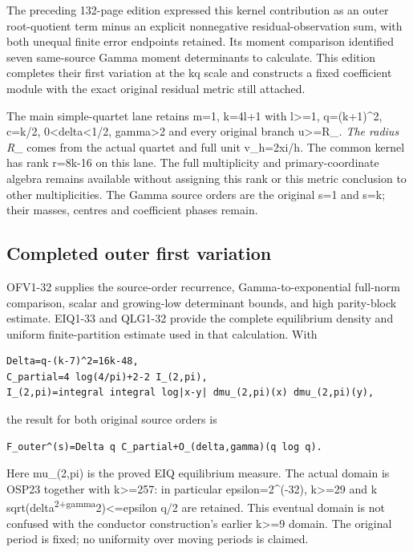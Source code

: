 \documentclass[
]{article}
\begin{document}
The preceding 132-page edition expressed this kernel contribution as an
outer root-quotient term minus an explicit nonnegative
residual-observation sum, with both unequal finite error endpoints
retained. Its moment comparison identified seven same-source Gamma
moment determinants to calculate. This edition completes their first
variation at the kq scale and constructs a fixed coefficient module with
the exact original residual metric still attached.

The main simple-quartet lane retains m=1, k=4l+1 with l\textgreater=1,
q=(k+1)\^{}2, c=k/2, 0\textless delta\textless1/2, gamma\textgreater2
and every original branch \textbar u\textbar\textgreater=R\_\emph{. The
radius R\_} comes from the actual quartet and full unit v\_h=2xi/h. The
common kernel has rank r=8k-16 on this lane. The full multiplicity and
primary-coordinate algebra remains available without assigning this rank
or this metric conclusion to other multiplicities. The Gamma source
orders are the original s=1 and s=k; their masses, centres and
coefficient phases remain.

\subsection{Completed outer first
variation}\label{completed-outer-first-variation}

OFV1-32 supplies the source-order recurrence, Gamma-to-exponential
full-norm comparison, scalar and growing-low determinant bounds, and
high parity-block estimate. EIQ1-33 and QLG1-32 provide the complete
equilibrium density and uniform finite-partition estimate used in that
calculation. With

\begin{verbatim}
Delta=q-(k-7)^2=16k-48,
C_partial=4 log(4/pi)+2-2 I_(2,pi),
I_(2,pi)=integral integral log|x-y| dmu_(2,pi)(x) dmu_(2,pi)(y),
\end{verbatim}

the result for both original source orders is

\begin{verbatim}
F_outer^(s)=Delta q C_partial+O_(delta,gamma)(q log q).
\end{verbatim}

Here mu\_(2,pi) is the proved EIQ equilibrium measure. The actual domain
is OSP23 together with k\textgreater=257: in particular
epsilon=2\^{}(-32), k\textgreater=29 and k
sqrt(delta\textsuperscript{2+gamma}2)\textless=epsilon q/2 are retained.
This eventual domain is not confused with the conductor construction's
earlier k\textgreater=9 domain. The original period is fixed; no
uniformity over moving periods is claimed.
\end{document}
